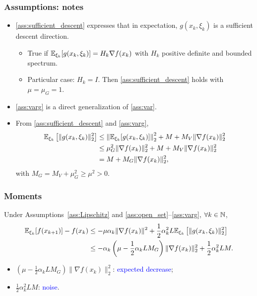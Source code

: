 \documentclass[usepdftitle=false, aspectratio=169]{beamer}
\begin{document}
\begin{frame}
\frametitle{Assumptions: notes}

\begin{itemize}
\item
\ref{ass:sufficient_descent} expresses that in expectation, $g(x_k, \xi_k)$ is a sufficient descent direction.
\begin{itemize}
	\item True if ${\mathbb{E}}_{\xi_k} [g(x_k, \xi_k)] = H_k \nabla f(x_k)$ with $H_k$ positive definite and bounded spectrum.
	\item Particular case: $H_k = I$. Then \ref{ass:sufficient_descent} holds with $\mu = \mu_G = 1$. 
\end{itemize}
\item 
\ref{ass:varg} is a direct generalization of \ref{ass:var}.
\item
From \ref{ass:sufficient_descent} and \ref{ass:varg},
\begin{align*}
{\mathbb{E}}_{\xi_k} \left[ \| g(x_k, \xi_k) \|^2_2 \right]
& \leq \left\| {\mathbb{E}}_{\xi_k} [ g(x_k, \xi_k) ] \right\|^2_2 + M + M_V \| \nabla f(x_k) \|_2^2 \\
& \leq \mu_G^2 \| \nabla f(x_k) \|_2^2 + M + M_V \| \nabla f(x_k) \|_2^2 \\
& = M + M_G \| \nabla f(x_k) \|_2^2,
\end{align*}
with $M_G = M_V + \mu_G^2 \geq \mu^2 > 0$.
\end{itemize}
\end{frame}

\begin{frame}
\frametitle{Moments}

\begin{theorem}[Moments]
	Under Assumptions~\ref{ass:Lipschitz} and \ref{ass:open_set}--\ref{ass:varg}, $\forall k \in {\mathbb{N}}$,
	\begin{align*}
		{\mathbb{E}}_{\xi_k}[f(x_{k+1})] - f(x_k)
		& \leq - \mu \alpha_k \| \nabla f(x_k) \|^2
		+ \frac{1}{2} \alpha_k^2 L {\mathbb{E}}_{\xi_k} \left[ \| g(x_k, \xi_k )\|_2^2 \right] \\
		& \leq - \alpha_k\left( \mu -\frac{1}{2}\alpha_k LM_G \right) \| \nabla f(x_k) \|_2^2
		+ \frac{1}{2} \alpha_k^2 LM.
	\end{align*}
\end{theorem}
\begin{itemize}
	\item $\left( \mu -\frac{1}{2}\alpha_k LM_G \right) \| \nabla f(x_k) \|_2^2$: \textcolor{blue}{expected decrease};
	\item $\frac{1}{2} \alpha_k^2 LM$: \textcolor{blue}{noise}.
\end{itemize}
\end{frame}
\end{document}
